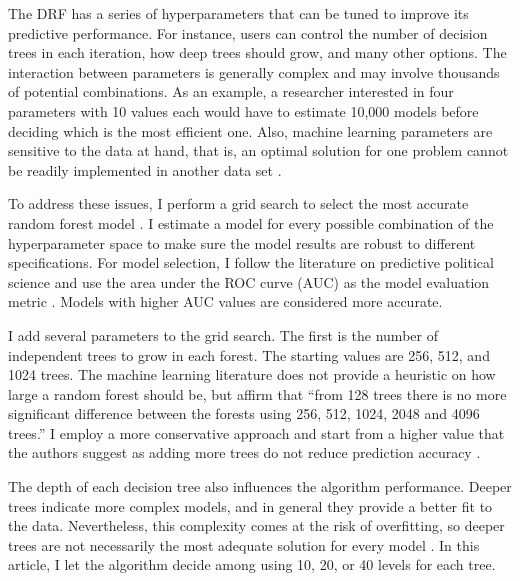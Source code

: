 \documentclass[a4paper,12pt]{article}
\begin{document}
The DRF has a series of hyperparameters that can be tuned to improve its predictive performance. For instance, users can control the number of decision trees in each iteration, how deep trees should grow, and many other options. The interaction between parameters is generally complex and may involve thousands of potential combinations. As an example, a researcher interested in four parameters with 10 values each would have to estimate 10,000 models before deciding which is the most efficient one. Also, machine learning parameters are sensitive to the data at hand, that is, an optimal solution for one problem cannot be readily implemented in another data set \citep{genuer2008random,goldstein2010application,jones2015exploratory}.
	
To address these issues, I perform a grid search to select the most accurate random forest model \citep[123]{cook2017h2o}. I estimate a model for every possible combination of the hyperparameter space to make sure the model results are robust to different specifications. For model selection, I follow the literature on predictive political science and use the area under the ROC curve (AUC) as the model evaluation metric \citep[e.g.,][]{hill2014empirical,ward2010perils,ward2013learning}. Models with higher AUC values are considered more accurate.
	
I add several parameters to the grid search. The first is the number of independent trees to grow in each forest. The starting values are 256, 512, and 1024 trees. The machine learning literature does not provide a heuristic on how large a random forest should be, but \citet[166]{oshiro2012many} affirm that ``from 128 trees there is no more significant difference between the forests using 256, 512, 1024, 2048 and 4096 trees.'' I employ a more conservative approach and start from a higher value that the authors suggest as adding more trees do not reduce prediction accuracy \citep[7]{breiman2001statistical}.
	
The depth of each decision tree also influences the algorithm performance. Deeper trees indicate more complex models, and in general they provide a better fit to the data. Nevertheless, this complexity comes at the risk of overfitting, so deeper trees are not necessarily the most adequate solution for every model \citep[596]{friedman2001greedy,segal2004machine}. In this article, I let the algorithm decide among using 10, 20, or 40 levels for each tree. 
	
\end{document}
